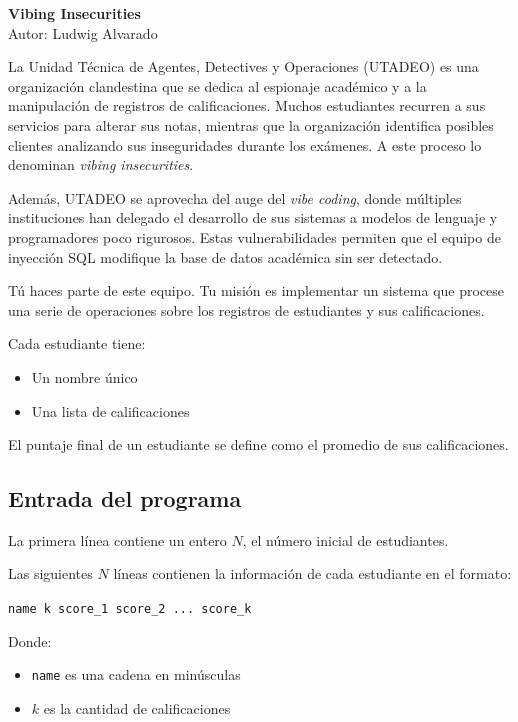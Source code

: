 \documentclass[11pt,a4paper]{article}
\begin{document}
\begin{center}
  {\LARGE \bf Vibing Insecurities}\\[1ex]
  Autor: Ludwig Alvarado
\end{center}

La Unidad Técnica de Agentes, Detectives y Operaciones (UTADEO) es una organización clandestina que se dedica al espionaje académico y a la manipulación de registros de calificaciones. Muchos estudiantes recurren a sus servicios para alterar sus notas, mientras que la organización identifica posibles clientes analizando sus inseguridades durante los exámenes. A este proceso lo denominan \textit{vibing insecurities}.

Además, UTADEO se aprovecha del auge del \textit{vibe coding}, donde múltiples instituciones han delegado el desarrollo de sus sistemas a modelos de lenguaje y programadores poco rigurosos. Estas vulnerabilidades permiten que el equipo de inyección SQL modifique la base de datos académica sin ser detectado.

Tú haces parte de este equipo. Tu misión es implementar un sistema que procese una serie de operaciones sobre los registros de estudiantes y sus calificaciones.

Cada estudiante tiene:
\begin{itemize}
    \item Un nombre único
    \item Una lista de calificaciones
\end{itemize}

El puntaje final de un estudiante se define como el promedio de sus calificaciones.

\subsection*{Entrada del programa}

La primera línea contiene un entero $N$, el número inicial de estudiantes.

Las siguientes $N$ líneas contienen la información de cada estudiante en el formato:

\texttt{name k score\_1 score\_2 ... score\_k}

Donde:
\begin{itemize}
    \item \texttt{name} es una cadena en minúsculas
    \item $k$ es la cantidad de calificaciones
\end{itemize}
\end{document}
